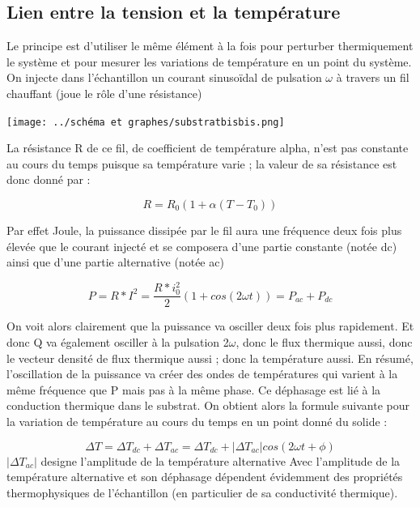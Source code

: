 \documentclass[10pt,a4paper]{report}
\begin{document}
\subsection{Lien entre la tension et la température}
Le principe est d’utiliser le même élément à la fois pour perturber thermiquement le système et pour mesurer les variations de température en un point du système. On injecte dans l’échantillon un courant sinusoïdal de pulsation $\omega$ à travers un fil chauffant (joue le rôle d’une résistance)
\begin{center}
\texttt{[image: ../schéma et graphes/substratbisbis.png]} 
\label{fig1}
\end{center}
La résistance R de ce fil, de coefficient de température alpha, n’est pas constante au cours du temps puisque sa température varie ; la valeur de sa résistance est donc donné par :
\begin{center}
\begin{equation}
R=R_{0}(1+\alpha(T-T_{0}))
\end{equation}
\end{center}
Par effet Joule, la puissance dissipée par le fil aura une fréquence deux fois plus élevée que le courant injecté et se composera d’une partie constante (notée dc) ainsi que d’une partie alternative (notée ac)
\begin{center}
\begin{equation}
P=R*I^2=\frac{R*i_{0}^2}{2}(1+cos(2\omega t))=P_{ac}+P_{dc}
\end{equation}
\end{center}
On voit alors clairement que la puissance va osciller deux fois plus rapidement. Et donc Q va également osciller à la pulsation 2$\omega$, donc le flux thermique aussi, donc le vecteur densité de flux thermique aussi ; donc la température aussi. En résumé, l’oscillation de la puissance va créer des ondes de températures qui varient à la même fréquence que P mais pas à la même phase. Ce déphasage est lié à la conduction thermique dans le substrat. On obtient alors la formule suivante pour la variation de température au cours du temps en un point donné du solide :
\begin{center}
\begin{equation}
\Delta T=\Delta T_{dc}+\Delta T_{ac}=\Delta T_{dc}+\lvert \Delta T_{ac} \rvert cos(2\omega t+\phi)
\end{equation}
$\lvert \Delta T_{ac} \rvert$ designe l’amplitude de la température alternative
Avec l’amplitude de la température alternative et son déphasage dépendent évidemment des propriétés thermophysiques de l’échantillon (en particulier de sa conductivité thermique).
\end{center}
\end{document}
